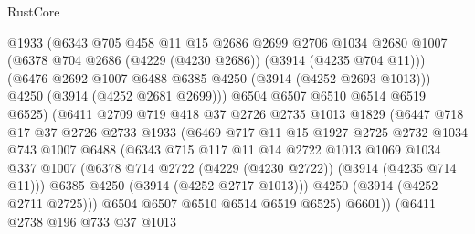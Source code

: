 \begin{lexlean}{RustCore}
\begin{coremodule}
                      @1933
                      (@6343
                        @705
                        @458
                        @11
                        @15
                        @2686
                        @2699
                        @2706
                        @1034
                        @2680
                        @1007
                        (@6378 @704 @2686 (@4229 (@4230 @2686)) (@3914 (@4235 @704 @11)))
                        (@6476 @2692 @1007 @6488 @6385 @4250 (@3914 (@4252 @2693 @1013)))
                        @4250
                        (@3914 (@4252 @2681 @2699)))
                      @6504
                      @6507
                      @6510
                      @6514
                      @6519
                      @6525)
                    (@6411
                      @2709
                      @719
                      @418
                      @37
                      @2726
                      @2735
                      @1013
                      @1829
                      (@6447
                        @718
                        @17
                        @37
                        @2726
                        @2733
                        @1933
                        (@6469
                          @717
                          @11
                          @15
                          @1927
                          @2725
                          @2732
                          @1034
                          @743
                          @1007
                          @6488
                          (@6343
                            @715
                            @117
                            @11
                            @14
                            @2722
                            @1013
                            @1069
                            @1034
                            @337
                            @1007
                            (@6378 @714 @2722 (@4229 (@4230 @2722)) (@3914 (@4235 @714 @11)))
                            @6385
                            @4250
                            (@3914 (@4252 @2717 @1013)))
                          @4250
                          (@3914 (@4252 @2711 @2725)))
                        @6504
                        @6507
                        @6510
                        @6514
                        @6519
                        @6525)
                      @6601))
                  (@6411
                    @2738
                    @196
                    @733
                    @37
                    @1013

\end{coremodule}
\end{lexlean}
